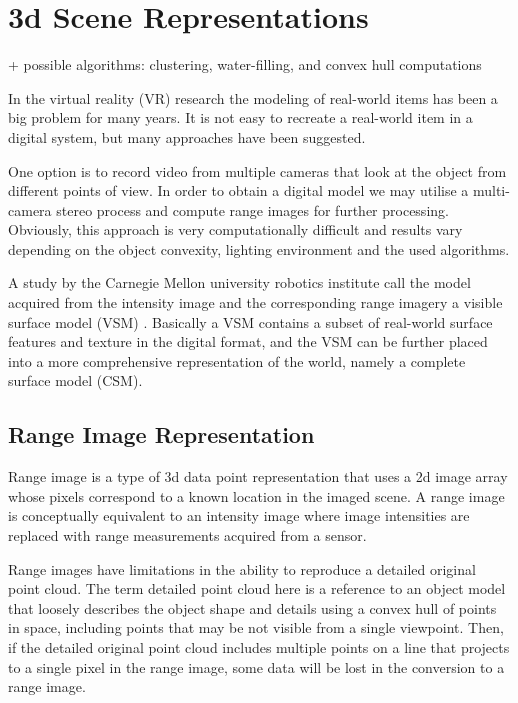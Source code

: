 \documentclass[12pt,a4paper,oneside,pdftex]{report}
\begin{document}
\section{3d Scene Representations}
\label{section:3d_scene_representations}
+ possible algorithms: clustering, water-filling, and convex hull computations

In the virtual reality (VR) research the modeling of real-world items has been a big problem for many years. 
It is not easy to recreate a real-world item in a digital system, but many approaches have been suggested.

One option is to record video from multiple cameras that look at the object from different points of view. In order to obtain a digital model we may utilise a multi-camera stereo process and compute range images for further processing. Obviously, this approach is very computationally difficult and results vary depending on the object convexity, lighting environment and the used algorithms.  

A study by the Carnegie Mellon university robotics institute call the model acquired from the intensity image and the corresponding range imagery a visible surface model (VSM) \cite{Rander97}. Basically a VSM contains a subset of real-world surface features and texture in the digital format, and the VSM can be further placed into a more comprehensive representation of the world, namely a complete surface model (CSM). 

\subsection{Range Image Representation}
\label{subsection:range_image_representation}

Range image is a type of 3d data point representation that uses a 2d image array whose pixels correspond to a known location in the imaged scene. A range image is conceptually equivalent to an intensity image where image intensities are replaced with range measurements acquired from a sensor.

Range images have limitations in the ability to reproduce a detailed original point cloud. The term detailed point cloud here is a reference to an object model that loosely describes the object shape and details using a convex hull of points in space, including points that may be not visible from a single viewpoint. Then, if the detailed original point cloud includes multiple points on a line that projects to a single pixel in the range image, some data will be lost in the conversion to a range image. 
\end{document}
